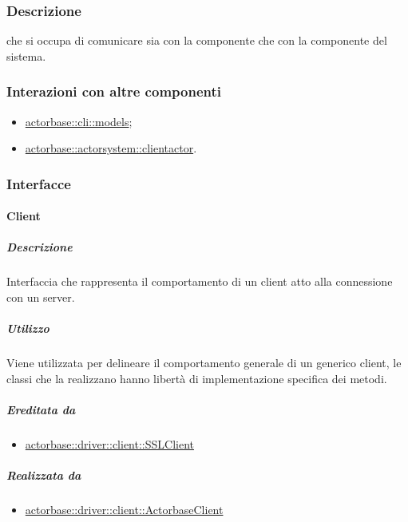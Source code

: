 \documentclass{scalatekids-article}
\begin{document}
\subsubsection{Descrizione}

 che si occupa di comunicare sia con la componente 
che con la componente  del sistema.

\subsubsection{Interazioni con altre componenti}

\begin{itemize}
\item \hyperref[sec:actorbase::cli::models]{actorbase::cli::models};
\item \hyperref[sec:actorbase::actorsystem::clientactor]{actorbase::actorsystem::clientactor}.
\end{itemize}

\subsubsection{Interfacce}

\paragraph{Client}
\label{sec:actorbase::driver::client::Client}

\subparagraph{Descrizione}

Interfaccia che rappresenta il comportamento di un client atto alla connessione con un server.

\subparagraph{Utilizzo}

Viene utilizzata per delineare il comportamento generale di un generico client,
le classi che la realizzano hanno libertà di implementazione specifica dei
metodi.

\subparagraph{Ereditata da}

\begin{itemize}
\item \hyperref[sec:actorbase::driver::client::SSLClient]{actorbase::driver::client::SSLClient}
\end{itemize}

\subparagraph{Realizzata da}

\begin{itemize}
\item \hyperref[sec:actorbase::driver::client::ActorbaseClient]{actorbase::driver::client::ActorbaseClient}
\end{itemize}
\end{document}
